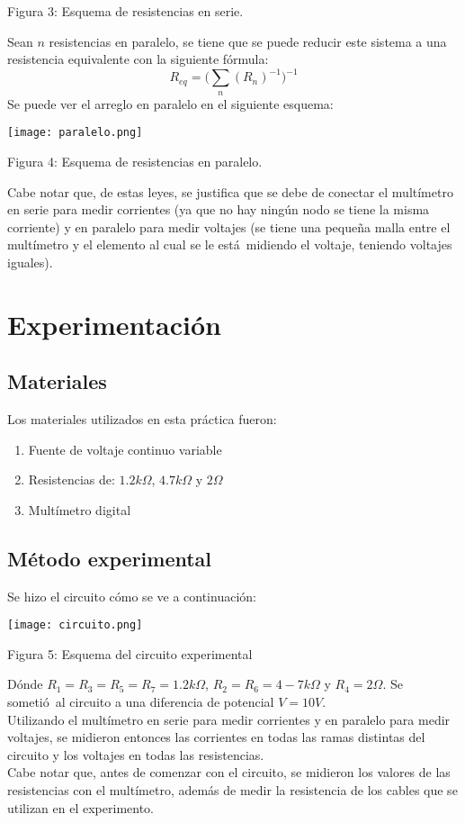 \documentclass{article}
\begin{document}
\begin{center}
Figura 3: Esquema de resistencias en serie.
\end{center}
Sean $n$ resistencias en paralelo, se tiene que se puede reducir este sistema a una resistencia equivalente con la siguiente f\'ormula:
\begin{equation}
R_{eq}=\Big( \sum_n (R_n)^{-1} \Big) ^{-1}
\end{equation}
Se puede ver el arreglo en paralelo en el siguiente esquema:
\begin{center}
\texttt{[image: paralelo.png]}
\end{center}
\begin{center}
Figura 4: Esquema de resistencias en paralelo.
\end{center}
Cabe notar que, de estas leyes, se justifica que se debe de conectar el mult\'imetro en serie para medir corrientes (ya que no hay ning\'un nodo se tiene la misma corriente) y en paralelo para medir voltajes (se tiene una peque\~na malla entre el mult\'imetro y el elemento al cual se le est\'a\ midiendo el voltaje, teniendo voltajes iguales).



\section{Experimentaci\'on}
\subsection{Materiales}
Los materiales utilizados en esta pr\'actica fueron:
\begin{enumerate}
\item Fuente de voltaje continuo variable
\item Resistencias de: $1.2k\Omega$, $4.7 k\Omega$ y $2\Omega$
\item Mult\'imetro digital
\end{enumerate}

\subsection{M\'etodo experimental}
Se hizo el circuito c\'omo se ve a continuaci\'on:
\begin{center}
\texttt{[image: circuito.png]}
\end{center}
\begin{center}
Figura 5: Esquema del circuito experimental
\end{center}
D\'onde $R_1=R_3=R_5=R_7=1.2k\Omega$, $R_2=R_6=4-7k\Omega$ y $R_4=2\Omega$. Se someti\'o\ al circuito a una diferencia de potencial $V=10V$. \\
Utilizando el mult\'imetro en serie para medir corrientes y en paralelo para medir voltajes, se midieron entonces las corrientes en todas las ramas distintas del circuito y los voltajes en todas las resistencias. \\
Cabe notar que, antes de comenzar con el circuito, se midieron los valores de las resistencias con el mult\'imetro, adem\'as de medir la resistencia de los cables que se utilizan en el experimento.
\end{document}
